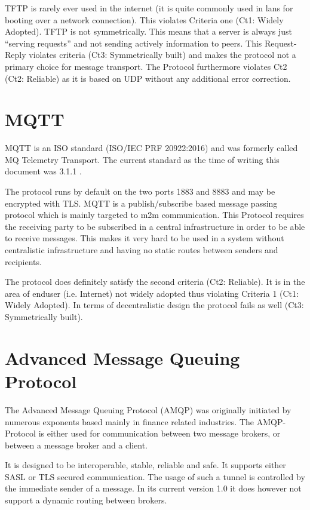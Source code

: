 \documentclass[a4paper,appendixprefix,pdfusetitle,twocolumn,draft,8pt]{scrbook}
\begin{document}
TFTP is rarely ever used in the internet (it is quite commonly used in lans for booting over a network connection). This violates Criteria one (Ct1: Widely Adopted). TFTP is not symmetrically. This means that a server is always just ``serving requests'' and not sending actively information to peers. This Request-Reply violates criteria (Ct3: Symmetrically built) and makes the protocol not a primary choice for  message transport. The Protocol furthermore violates Ct2 (Ct2: Reliable) as it is based on UDP without any additional error correction.

\section{MQTT}
MQTT is an ISO standard (ISO/IEC PRF 20922:2016) and was formerly called MQ Telemetry Transport. The current standard as the time of writing this document was 3.1.1 \cite{mqtt}. 

The protocol runs by default on the two ports 1883 and 8883 and may be encrypted with TLS. MQTT is a publish/subscribe based message passing protocol which is mainly targeted to m2m communication. This Protocol requires the receiving party to be subscribed in a central infrastructure in order to be able to receive messages. This makes it very hard to be used in a system without centralistic infrastructure and having no static routes between senders and recipients.

The protocol does definitely satisfy the second criteria (Ct2: Reliable). It is in the area of enduser (i.e. Internet) not widely adopted thus violating Criteria 1 (Ct1: Widely Adopted). In terms of decentralistic design the protocol fails as well (Ct3: Symmetrically built).

\section{Advanced Message Queuing Protocol}
The Advanced Message Queuing Protocol (AMQP) was originally initiated by numerous exponents based mainly in finance related industries. The AMQP-Protocol is either used for communication between two message brokers, or between a message broker and a client\cite{amqp}.

It is designed to be interoperable, stable, reliable and safe. It supports either SASL or TLS secured communication. The usage of such a tunnel is controlled by the immediate sender of a message. In its current version 1.0 it does however not support a dynamic routing between brokers\cite{amqp}.
\end{document}
